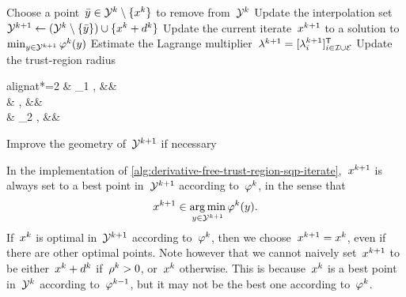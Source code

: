 \begin{algorithm}
{{        }{
            Choose a point~$\bar{y} \in \xpt[k] \setminus \set{\iter[k]}$ to remove from~$\xpt[k]$\; 
        }
        Update the interpolation set~$\xpt[k + 1] \gets (\xpt[k] \setminus \set{\bar{y}}) \cup \set{\iter[k] + \step[k]}$\;
        Update the current iterate~$\iter[k + 1]$ to a solution to~$\min_{y \in \xpt[k + 1]} \merit[k](y)$\; 
        Estimate the Lagrange multiplier~$\lm[k + 1] = [\lm[k + 1]_i]_{i \in \iub \cup \ieq}^{\T}$\; 
        Update the trust-region radius
        \begin{algoempheq}[left={\rad[k + 1] \gets \empheqlbrace}]{alignat*=2}
            & \theta_1 \rad[k],  && \quad {}\\
            & \rad[k],           && \quad {}\\
            & \theta_2 \rad[k],  && \quad {}
        \end{algoempheq} \label{alg:derivative-free-trust-region-sqp-radius}
        Improve the geometry of~$\xpt[k + 1]$ if necessary\; \label{alg:derivative-free-trust-region-sqp-geometry}
    }
\end{algorithm}

In the implementation of \cref{alg:derivative-free-trust-region-sqp-iterate},~$\iter[k + 1]$ is always set to a best point in~$\xpt[k + 1]$ according to~$\merit[k]$, in the sense that
\begin{equation*}
    \iter[k + 1] \in \argmin_{y \in \xpt[k + 1]} \merit[k](y).
\end{equation*}
If~$\iter[k]$ is optimal in~$\xpt[k + 1]$ according to~$\merit[k]$, then we choose~$\iter[k + 1] = \iter[k]$, even if there are other optimal points.
Note however that we cannot naively set~$\iter[k + 1]$ to be either~$\iter[k] + \step[k]$ if~$\ratio[k] > 0$, or~$\iter[k]$ otherwise.
This is because~$\iter[k]$ is a best point in~$\xpt[k]$ according to~$\merit[k - 1]$, but it may not be the best one according to~$\merit[k]$.


